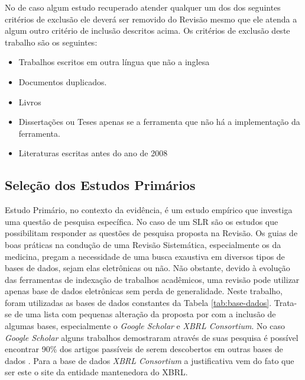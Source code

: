 \documentclass[12pt]{article}
\begin{document}
No de caso algum estudo recuperado atender qualquer um dos dos seguintes
critérios de exclusão ele deverá ser removido do Revisão mesmo que ele atenda a
algum outro critério de inclusão descritos acima. Os critérios de exclusão
deste trabalho são os seguintes:

\begin{itemize}
\item Trabalhos escritos em outra língua que não a inglesa
\item Documentos duplicados.
\item Livros
\item Dissertações ou Teses apenas se a ferramenta que não há a implementação da
  ferramenta.
\item Literaturas escritas antes do ano de 2008
\end{itemize}

\subsection{Seleção dos Estudos Primários}
\label{subsec:estudos-primarios}

Estudo Primário, no contexto da evidência, é um estudo empírico que investiga
uma questão de pesquisa específica\cite{keele2007guidelines}. No caso de um SLR são os estudos que
possibilitam responder as questões de pesquisa proposta na Revisão. Os guias de boas práticas na condução de uma Revisão Sistemática, especialmente
os da medicina, pregam a necessidade de uma busca exaustiva em diversos tipos
de bases de dados, sejam elas eletrônicas ou não. Não obstante, devido à
evolução das ferramentas de indexação de trabalhos acadêmicos, uma revisão pode
utilizar apenas base de dados eletrônicas sem perda de generalidade. Neste
trabalho, foram utilizadas as bases de dados constantes da Tabela
\ref{tab:base-dados}. Trata-se de uma lista com pequenas alteração da
proposta por \cite{Brereton2007571} com a inclusão de algumas bases,
especialmente o \textit{Google Scholar} e  \textit{XBRL Consortium}. No caso
\textit{Google Scholar} alguns trabalhos demostraram através de suas pesquisa é
possível encontrar 90\% dos artigos passíveis de serem descobertos em outras
bases de dados \cite{yasin2012quality}. Para a base de dados \textit{XBRL
  Consortium} a justificativa vem do fato que ser este o  site da entidade mantenedora do XBRL.
\end{document}
